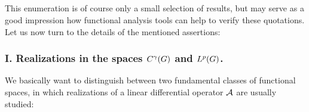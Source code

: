 \documentclass[11pt,twoside]{article}
\begin{document}
\subparagraph{}
This enumeration is of course only a small selection of results,
but may serve as a good impression
how functional analysis tools can help to verify these quotations.
Let us now turn to the details of the mentioned assertions:

\def\TITLEA{Realizations in the spaces $C^{\gamma}(\G)$ and $\Lp$.}
\def\TITLEB{The closeness of strongly elliptic Dirichlet operators.}
\def\TITLEC{Formally adjoint expressions and adjointness theorems.}
\def\TITLED{{\GARDING}'s inequality and quasi-coercive Dirichlet forms.}
\def\TITLEE{Weak solutions of elliptic boundary value problems.}
\def\TITLEF{The Fredholm property of properly elliptic operators.}
\def\TITLEG{Spectral theory and sectorialness of strongly elliptic operators.}
\def\TITLEH{Self-adjoint extensions of half-bounded operators.}

\subsubsection{I. \TITLEA}
We basically want to distinguish between two fundamental classes
of functional spaces,
in which realizations of a linear differential operator ${\mathcal{A}}$
are usually studied:
\end{document}
